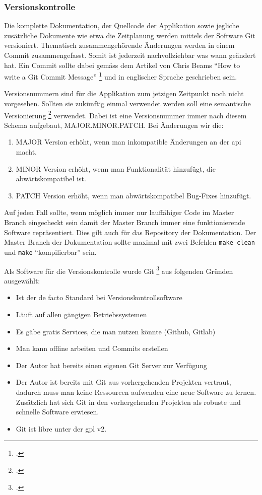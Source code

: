 \subsubsection{Versionskontrolle}
\label{sec:orge6b8a04}

Die komplette Dokumentation, der Quellcode der Applikation sowie jegliche
zusätzliche Dokumente wie etwa die Zeitplanung werden mittels der Software Git
versioniert. Thematisch zusammengehörende Änderungen werden in einem Commit
zusammengefasst. Somit ist jederzeit nachvollziehbar was wann geändert hat. Ein
Commit sollte dabei gemäss dem Artikel von Chris Beams "`How to write a Git
Commit Message"' \footcite{commit} und in englischer Sprache geschrieben sein.

Versionsnummern sind für die Applikation zum jetzigen Zeitpunkt noch nicht
vorgesehen. Sollten sie zukünftig einmal verwendet werden soll eine semantische
Versionierung \footcite{semver} verwendet. Dabei ist eine Versionsnummer immer
nach diesem Schema aufgebaut, MAJOR.MINOR.PATCH. Bei Änderungen wir die:
\begin{enumerate}
\item MAJOR Version erhöht, wenn man inkompatible Änderungen an der \gls{api} macht.
\item MINOR Version erhöht, wenn man Funktionalität hinzufügt, die
abwärtskompatibel ist.
\item PATCH Version erhöht, wenn man abwärtskompatibel Bug-Fixes hinzufügt.
\end{enumerate}

Auf jeden Fall sollte, wenn möglich immer nur lauffähiger Code im Master Branch
eingecheckt sein damit der Master Branch immer eine funktionierende Software
repräsentiert. Dies gilt auch für das Repository der Dokumentation. Der Master
Branch der Dokumentation sollte maximal mit zwei Befehlen \texttt{make clean} und
\texttt{make} "`kompilierbar"' sein.

Als Software für die Versionskontrolle wurde Git \footcite{git} aus folgenden
Gründen ausgewählt:

\begin{itemize}
\item Ist der de facto Standard bei Versionskontrollsoftware
\item Läuft auf allen gängigen Betriebssystemen
\item Es gäbe gratis Services, die man nutzen könnte (Github, Gitlab)
\item Man kann offline arbeiten und Commits erstellen
\item Der Autor hat bereits einen eigenen Git Server zur Verfügung
\item Der Autor ist bereits mit Git aus vorhergehenden Projekten vertraut,
dadurch muss man keine Ressourcen aufwenden eine neue Software zu lernen.
Zusätzlich hat sich Git in den vorhergehenden Projekten als robuste
und schnelle Software erwiesen.
\item Git ist \gls{libre} unter der \gls{gpl} v2.
\end{itemize}

